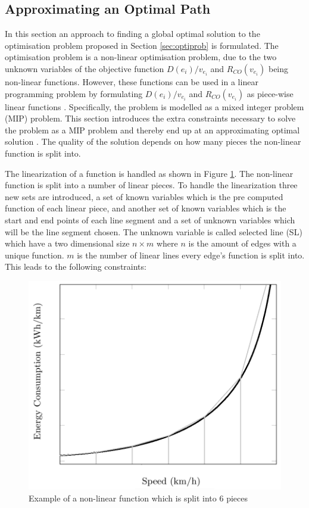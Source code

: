 
\subsection{Approximating an Optimal Path}\label{sec:LP}
In this section an approach to finding a global optimal solution to the optimisation problem proposed in Section \ref{sec:optiprob} is formulated. The optimisation problem is a non-linear optimisation problem, due to the two unknown variables of the objective function \( D(e_i)/v_{e_i} \) and $R_{CO}(v_{e_i})$ being non-linear functions. However, these functions can be used in a linear programming problem by formulating \( D(e_i)/v_{e_i} \) and $R_{CO}(v_{e_i})$ as piece-wise linear functions \cite{ahuja1995capacity}. Specifically, the problem is modelled as a mixed integer problem (MIP) problem. This section introduces the extra constraints necessary to solve the problem as a MIP problem and thereby end up at an approximating optimal solution \cite{piecewiseglpk}. The quality of the solution depends on how many pieces the non-linear function is split into. 

The linearization of a function is handled as shown in Figure \ref{fig:linearization_example}. The non-linear function is split into a number of linear pieces. To handle the linearization three new sets are introduced, a set of known variables which is the pre computed function of each linear piece, and another set of known variables which is the start and end points of each line segment and a set of unknown variables which will be the line segment chosen. The unknown variable is called selected line (SL) which have a two dimensional size $n \times m$ where $n$ is the amount of edges with a unique function. $m$ is the number of linear lines every edge's function is split into. This leads to the following constraints:  

\begin{figure}[h!]
\centering
\includegraphics[scale=0.33]{images/linearization_example}
\caption{Example of a non-linear function which is split into 6 pieces}
\label{fig:linearization_example}
\end{figure}

